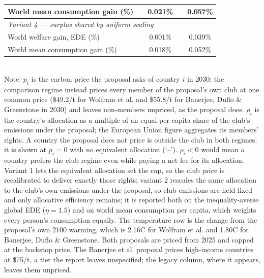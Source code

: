 \begin{table}[htbp]
\begin{tabular}{lcccc}
  \quad World mean consumption gain (\%) &  & 0.021\% &  & 0.057\% \\
  \midrule
  \multicolumn{5}{l}{\textit{Variant 4 --- surplus shared by uniform scaling}} \\
  \quad World welfare gain, EDE (\%) &  & 0.001\% &  & 0.039\% \\
  \quad World mean consumption gain (\%) &  & 0.018\% &  & 0.052\% \\
  \bottomrule
\end{tabular}
\label{tab:equiv_rights_B}
\\[4pt]
{\footnotesize Note: $p_i$ is the carbon price the proposal asks of country $i$ in 2030; the comparison regime instead prices every member of the proposal's own club at one common price (\$49.2/t for Wolfram et al. and \$55.8/t for Banerjee, Duflo \& Greenstone in 2030) and leaves non-members unpriced, as the proposal does. $\rho_i$ is the country's allocation as a multiple of an equal-per-capita share of the club's emissions under the proposal; the European Union figure aggregates its members' rights. A country the proposal does not price is outside the club in both regimes: it is shown at $p_i=0$ with no equivalent allocation (`--'). $\rho_i < 0$ would mean a country prefers the club regime even while paying a net fee for its allocation. Variant 1 lets the equivalent allocation set the cap, so the club price is recalibrated to deliver exactly those rights; variant 2 rescales the same allocation to the club's own emissions under the proposal, so club emissions are held fixed and only allocative efficiency remains; it is reported both on the inequality-averse global EDE ($\eta=1.5$) and on world mean consumption per capita, which weights every person's consumption equally. The temperature row is the change from the proposal's own 2100 warming, which is 2.16\textdegree{}C for Wolfram et al. and 1.80\textdegree{}C for Banerjee, Duflo \& Greenstone. Both proposals are priced from 2025 and capped at the backstop price. The Banerjee et al. proposal prices high-income countries at \$75/t, a tier the report leaves unspecified; the legacy column, where it appears, leaves them unpriced.}
\end{table}
